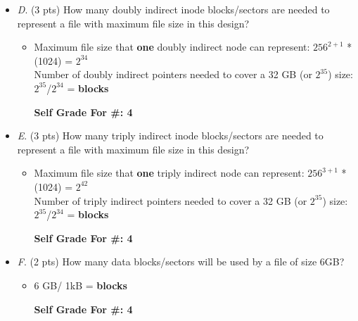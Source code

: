 \documentclass[conference]{IEEEtran}
\begin{document}
\begin{itemize}
\item \textit{D}. (3 pts) How many doubly indirect inode blocks/sectors are needed to represent a file with
	maximum file size in this design?
	\begin{itemize} 
		\item Maximum file size that \textbf{one} doubly indirect node can represent: $256^{2+1}$ * (1024) = $2^{34}$ \\
		Number of doubly indirect pointers needed to cover a 32 GB (or $2^{35}$) size: $2^{35}$/$2^{34}$ =  \textbf{blocks}
		\begin{center}
			\textbf{Self Grade For \#: 4}
		\end{center}
	\end{itemize}
\end{itemize}

\begin{itemize}
\item \textit{E}. (3 pts) How many triply indirect inode blocks/sectors are needed to represent a file with
	maximum file size in this design?
	\begin{itemize} 
		\item Maximum file size that \textbf{one} triply indirect node can represent: $256^{3+1}$ * (1024) = $2^{42}$ \\
		Number of triply indirect pointers needed to cover a 32 GB (or $2^{35}$) size: $2^{35}$/$2^{34}$ =  \textbf{blocks}
		\begin{center}
			\textbf{Self Grade For \#: 4}
		\end{center}
	\end{itemize}
\end{itemize}

\begin{itemize}
\item \textit{F}. (2 pts) How many data blocks/sectors will be used by a file of size 6GB?
	\begin{itemize} 
		\item 6 GB/ 1kB =  \textbf{blocks} 
		 \begin{center}
		 	\textbf{Self Grade For \#: 4}
		 \end{center}
	\end{itemize}
\end{itemize}

\end{document}
